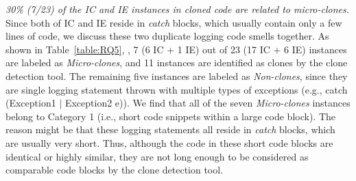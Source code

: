  {\em 30\% (7/23) of the IC and IE instances in cloned code are related to micro-clones.} Since both of IC and IE reside in {\em catch} blocks, which usually contain only a few lines of code, we discuss these two duplicate logging code smells together. As shown in Table~\ref{table:RQ5}, , 7 (6 IC + 1 IE) out of 23 (17 IC + 6 IE) instances are labeled as {\em Micro-clones}, and 11 instances are identified as clones by the clone detection tool. The remaining five instances are labeled as {\em Non-clones}, since they are single logging statement thrown with multiple types of exceptions (e.g., {\sf catch (Exception1 \(|\)  Exception2 e)}). We find that all of the seven {\em Micro-clones} instances belong to Category 1 (i.e., short code snippets within a large code block). The reason might be that these logging statements all reside in {\em catch} blocks, which are usually very short. Thus, although the code in these short code blocks are identical or highly similar, they are not long enough to be considered as comparable code blocks by the clone detection tool. %



